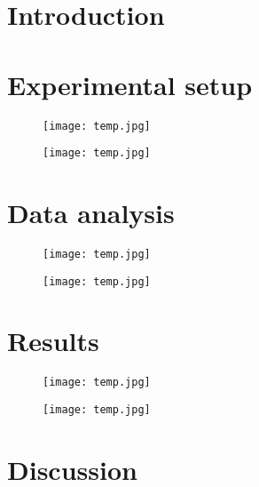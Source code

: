 \documentclass{article}
\begin{document}
\section{Introduction}

\section{Experimental setup}
\begin{figure}
  \texttt{[image: temp.jpg]}
  \label{Chemically etched boards and chamber installation}
\end{figure}
\begin{figure}
  \texttt{[image: temp.jpg]}
  \label{Configuration of chambers with different avalanche techniques}
\end{figure}

\section{Data analysis}
\begin{figure}
  \texttt{[image: temp.jpg]}
  \label{Comparison of cluster widths for typical response of each avalanche technology under normal running configurations.}
\end{figure}
\begin{figure}
  \texttt{[image: temp.jpg]}
  \label{Example of 2D-correction due to differential non-linearity.}
\end{figure}

\section{Results}
\begin{figure}
  \texttt{[image: temp.jpg]}
  \label{Coparison of resolution as a function of X-stretch (\%) for a particular X-pitch and Y-period configuration.}
\end{figure}
\begin{figure}
  \texttt{[image: temp.jpg]}
  \label{Coparison of resolution as a function of X-pitch (\%) for a particular X-stretch and Y-period configuration.}
\end{figure}

\section{Discussion}
\end{document}
